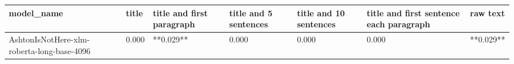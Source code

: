 \begin{tabular}{lllllll}
\toprule
                                model\_name & title & title and first paragraph & title and 5 sentences & title and 10 sentences & title and first sentence each paragraph &  raw text \\
\midrule
AshtonIsNotHere-xlm-roberta-long-base-4096 & 0.000 &                 **0.029** &                 0.000 &                  0.000 &                                   0.000 & **0.029** \\
\bottomrule
\end{tabular}

